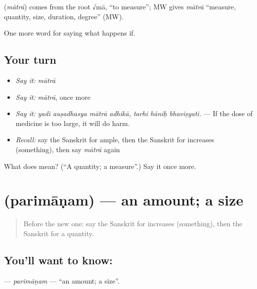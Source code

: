 \begin{cousinweb}
\textbf{} (\emph{mātrā}) comes from the root √mā, \textquotedblleft{}to measure\textquotedblright{}; MW gives \emph{mātrā} \textquotedblleft{}measure, quantity, size, duration, degree\textquotedblright{} (MW).
\end{cousinweb}

\begin{grammarlens}[title={What you've built}]
One more word for saying what happens if.
\end{grammarlens}

\subsection*{Your turn}
\begin{itemize}
\raggedright
  \item \emph{Say it:} \emph{mātrā}
  \item \emph{Say it:} \emph{mātrā}, once more
  \item \emph{Say it:} \emph{yadi auṣadhasya mātrā adhikā, tarhi hāniḥ bhaviṣyati.} — If the dose of medicine is too large, it will do harm.
  \item \emph{Recall:} say the Sanskrit for ample, then the Sanskrit for increases (something), then say \emph{mātrā} again
\end{itemize}

\begin{tcolorbox}[breakable,colback=teal!4,colframe=teal!35!black,title={Before you move on}]
What does  mean? (\textquotedblleft{}A quantity; a measure\textquotedblright{}.) Say it once more.
\end{tcolorbox}
\section[\texorpdfstring{\sk{परिमाणम्} (parimāṇam)}{परिमाणम् (parimāṇam)}]{ (parimāṇam) — an amount; a size}

\label{lesson:SA-C380-parimanam}



\begin{quote}
Before the new one: say the Sanskrit for increases (something), then the Sanskrit for a quantity.
\end{quote}

\subsection*{You'll want to know: }
\textbf{} — \emph{parimāṇam} — \textquotedblleft{}an amount; a size\textquotedblright{}.

